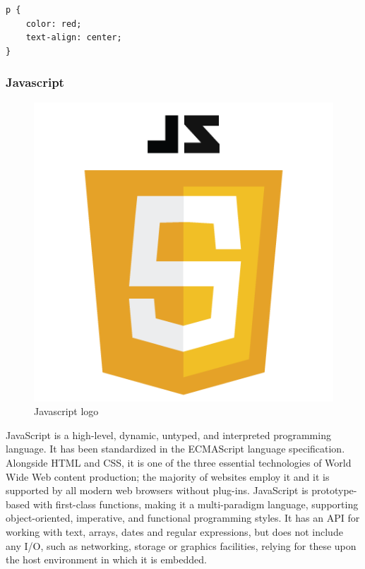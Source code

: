 \begin{verbatim}
p {
    color: red;
    text-align: center;
} 
\end{verbatim}

\subsubsection{Javascript}
\begin{figure}[h]
\centering \includegraphics[scale=0.3]{input/images/JS.png}
\caption{Javascript logo}
\end{figure}
JavaScript is a high-level, dynamic, untyped, and interpreted programming language. It has been standardized in the ECMAScript language specification. Alongside HTML and CSS, it is one of the three essential technologies of World Wide Web content production; the majority of websites employ it and it is supported by all modern web browsers without plug-ins. JavaScript is prototype-based with first-class functions, making it a multi-paradigm language, supporting object-oriented, imperative, and functional programming styles. It has an API for working with text, arrays, dates and regular expressions, but does not include any I/O, such as networking, storage or graphics facilities, relying for these upon the host environment in which it is embedded.

